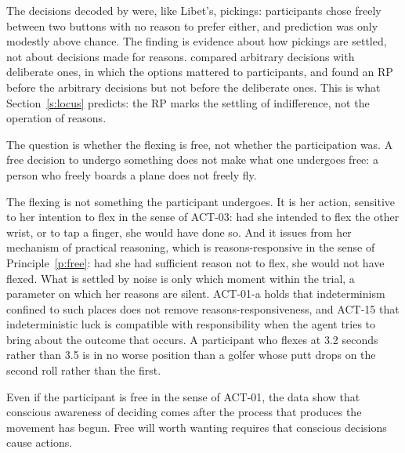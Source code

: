 \documentclass{situationist-preprint}
\begin{document}
\begin{reply}
The decisions decoded by \citet{Soon2008} were, like Libet's, pickings: participants chose freely between two buttons with no reason to prefer either, and prediction was only modestly above chance. The finding is evidence about how pickings are settled, not about decisions made for reasons. \citet{Maoz2019} compared arbitrary decisions with deliberate ones, in which the options mattered to participants, and found an RP before the arbitrary decisions but not before the deliberate ones. This is what Section~\ref{s:locus} predicts: the RP marks the settling of indifference, not the operation of reasons.
\end{reply}

\begin{objection}
The question is whether the flexing is free, not whether the participation was. A free decision to undergo something does not make what one undergoes free: a person who freely boards a plane does not freely fly.
\end{objection}

\begin{reply}
The flexing is not something the participant undergoes. It is her action, sensitive to her intention to flex in the sense of ACT-03: had she intended to flex the other wrist, or to tap a finger, she would have done so. And it issues from her mechanism of practical reasoning, which is reasons-responsive in the sense of Principle~\ref{p:free}: had she had sufficient reason not to flex, she would not have flexed. What is settled by noise is only which moment within the trial, a parameter on which her reasons are silent. ACT-01-a holds that indeterminism confined to such places does not remove reasons-responsiveness, and ACT-15 that indeterministic luck is compatible with responsibility when the agent tries to bring about the outcome that occurs. A participant who flexes at 3.2 seconds rather than 3.5 is in no worse position than a golfer whose putt drops on the second roll rather than the first.
\end{reply}

\begin{objection}
Even if the participant is free in the sense of ACT-01, the data show that conscious awareness of deciding comes after the process that produces the movement has begun. Free will worth wanting requires that conscious decisions cause actions.
\end{objection}
\end{document}
